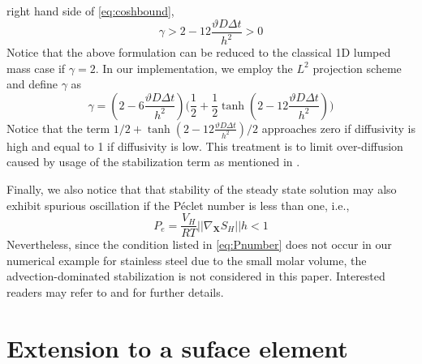 \documentclass[10pt]{elsarticle}
\newcommand{\mbs}[1]{\boldsymbol{#1}}
\def\bs{{\mbs{s}}} \def\bt{{\mbs{t}}} \def\bu{{\mbs{u}}}
\def\bs{\boldsymbol}
\begin{document}
right hand side of \eqref{eq:coshbound},
\begin{equation}
  \label{eq:stabL2bound} 
  \gamma > 2 -12 \frac{\vartheta D \Delta t}{h^{2}} > 0 
\end{equation}
Notice that the above formulation can be reduced to the
  classical 1D lumped mass case if $\gamma = 2$. In our implementation, 
  we employ the $L^{2}$ projection scheme and define $\gamma$ as
\begin{equation}
  \label{eq:arctang} 
  \gamma = (2 - 6 \frac{\vartheta D \Delta t}{h^{2}}) \Big(\frac{1}{2} + \frac{1}{2} \tanh( 2 - 12 \frac{\vartheta D \Delta t}{h^{2}}) \Big) 
\end{equation}
Notice that the term $1/2 + \tanh( 2 - 12 \frac{\vartheta D \Delta
  t}{h^{2}})/2 $ approaches zero if diffusivity is high and equal to 1
if diffusivity is low.  This treatment is to limit over-diffusion
caused by usage of the stabilization term as mentioned in
\citep{Sun:2013}. 

Finally, we also notice that  that stability of the steady state solution may also exhibit spurious oscillation if the P\'{e}clet number is less than one, i.e.,
\begin{equation}
\label{eq:Pnumber} P_{e}  = \frac{V_{H}}{RT} || \nabla_{\bs{X}}  S_{H} || h < 1
\end{equation} 
Nevertheless, since the condition listed in \eqref{eq:Pnumber} does not occur in our
numerical example for stainless steel due to the small molar volume, the
advection-dominated stabilization is not considered in this paper. Interested readers
may refer to \citep{Onate:2000} and \citep{Tezduyar:1986} for further details. 

\section{Extension to a suface element}
\label{section.extension}
\end{document}
